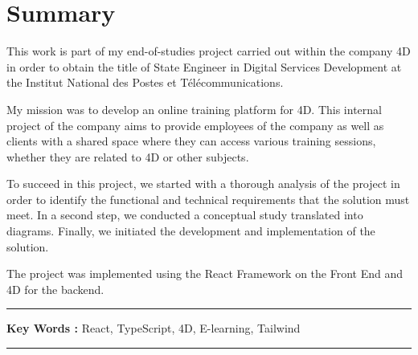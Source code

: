 \chapter*{Summary}


\hspace{10pt}This work is part of my end-of-studies project carried out within the company 4D in order to obtain the title of State Engineer in Digital Services Development at the Institut National des Postes et Télécommunications.

\vspace{10pt}

My mission was to develop an online training platform for 4D. This internal project of the company aims to provide employees of the company as well as clients with a shared space where they can access various training sessions, whether they are related to 4D or other subjects.

\vspace{10pt}

To succeed in this project, we started with a thorough analysis of the project in order to identify the functional and technical requirements that the solution must meet. In a second step, we conducted a conceptual study translated into diagrams. Finally, we initiated the development and implementation of the solution.

\vspace{10pt}

The project was implemented using the React Framework on the Front End and 4D for the backend.

\vspace{10pt}

\noindent\rule[2pt]{\textwidth}{0.5pt}

{\textbf{Key Words :}}
React, TypeScript, 4D, E-learning, Tailwind
\\
\noindent\rule[2pt]{\textwidth}{0.5pt}